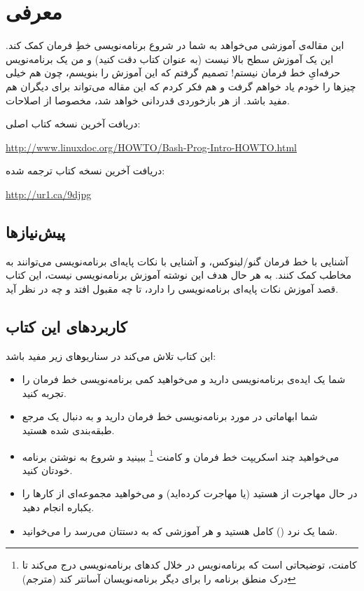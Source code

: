 \chapter{معرفی}
این مقاله‌ی آموزشی می‌خواهد به شما در شروع برنامه‌نویسی خطِ فرمان کمک کند‌. این
یک آموزش سطح بالا نیست (‌به عنوان کتاب دقت کنید‌)‌ و من یک برنامه‌نویس حرفه‌ایِ
خط فرمان نیستم‌! تصمیم گرفتم که این آموزش را بنویسم‌، چون هم خیلی چیز‌ها را خودم
یاد خواهم گرفت و هم فکر کردم که این مقاله می‌تواند برای دیگران هم مفید باشد‌. از
هر باز‌خوردی قدر‌دانی خواهد شد‌، مخصوصا از اصلاحات.

دریافت آخرین نسخه کتاب اصلی:

\begin{flushleft}
\url{http://www.linuxdoc.org/HOWTO/Bash-Prog-Intro-HOWTO.html}
\end{flushleft}

دریافت آخرین نسخه کتاب ترجمه شده:

\begin{flushleft}
\url{http://ur1.ca/9djpg}
\end{flushleft}



\section*{پیش‌نیازها}
آشنایی با خط فرمان گنو‌/‌لینوکس‌، و آشنایی با نکات پایه‌ای برنامه‌نویسی می‌توانند
به مخاطب کمک کنند. به هر حال هدف این نوشته آموزش برنامه‌نویسی نیست‌‌، این کتاب قصد
آموزش نکات پایه‌ای برنامه‌نویسی
 را دارد‌، تا چه مقبول افتد و چه در نظر آید.

\section*{کاربرد‌های این کتاب}
این کتاب تلاش می‌کند در سناریوهای زیر مفید باشد‌:

\begin{itemize}
\item{
		شما یک ایده‌ی برنامه‌نویسی دارید‌ و می‌خواهید کمی برنامه‌نویسی خط فرمان را تجربه
		کنید‌.
}

\item{
شما ابهاماتی در مورد برنامه‌نویسی خط فرمان دارید و به دنبال یک مرجع طبقه‌بندی شده
هستید‌.
}

\item{
می‌خواهید چند اسکریپت خط فرمان و کامنت
\footnote{
کامنت، توضیحاتی است که برنامه‌نویس در خلال کدهای برنامه‌نویسی درج می‌کند تا درک
منطق برنامه را برای دیگر برنامه‌نویسان آسانتر کند (مترجم)
}
ببینید و شروع به نوشتن برنامه خودتان کنید‌.
}

\item{
در حال مهاجرت از
هستید (‌یا مهاجرت کرده‌اید) و می‌خواهید‌ مجموعه‌ای
از کارها را یکباره انجام دهید.
}

\item{
شما یک نرد
()
کامل هستید و هر آموزشی که به دستتان می‌رسد را می‌خوانید.
}
\end{itemize}